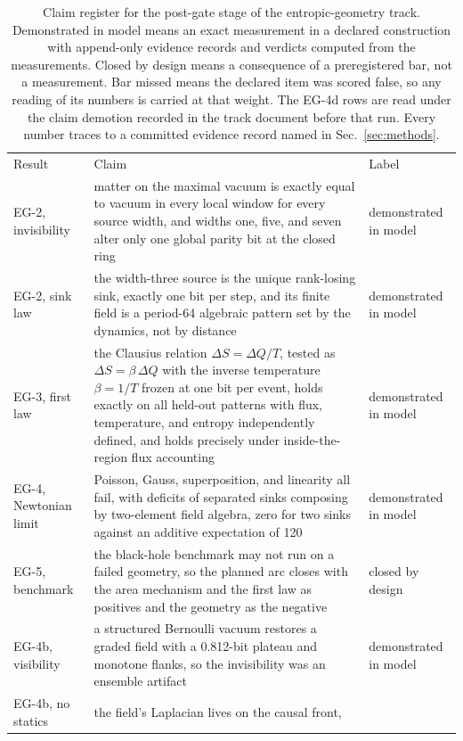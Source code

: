 \documentclass[aps,pre,reprint,nofootinbib]{revtex4-2}
\begin{document}
\begin{table}[t]
\caption{Claim register for the post-gate stage of the
entropic-geometry track.  Demonstrated in model means an exact
measurement in a declared construction with append-only evidence
records and verdicts computed from the measurements.  Closed by
design means a consequence of a preregistered bar, not a measurement.
Bar missed means the declared item was scored false, so any reading
of its numbers is carried at that weight.
The EG-4d rows are read under the claim demotion recorded in the
track document before that run.  Every number traces to a committed
evidence record named in Sec.~\ref{sec:methods}.}
\label{tab:claims}
\begin{ruledtabular}
\begin{tabular}{L{4.6cm} L{9.2cm} l}
Result & Claim & Label \\
\colrule
EG-2, invisibility & matter on the maximal vacuum is exactly equal to
vacuum in every local window for every source width, and widths one,
five, and seven alter only one global parity bit at the closed ring &
demonstrated in model \\
EG-2, sink law & the width-three source is the unique rank-losing
sink, exactly one bit per step, and its finite field is a period-64
algebraic pattern set by the dynamics, not by distance &
demonstrated in model \\
EG-3, first law & the Clausius relation $\Delta S = \Delta Q / T$,
tested as $\Delta S = \beta\,\Delta Q$ with the inverse temperature
$\beta = 1/T$ frozen at one bit per event, holds exactly on all
held-out patterns with flux, temperature, and entropy independently
defined, and holds precisely under inside-the-region flux accounting
& demonstrated in model \\
EG-4, Newtonian limit & Poisson, Gauss, superposition, and linearity
all fail, with deficits of separated sinks composing by two-element
field algebra, zero for two sinks against an additive expectation of
120 & demonstrated in model \\
EG-5, benchmark & the black-hole benchmark may not run on a failed
geometry, so the planned arc closes with the area mechanism and the
first law as positives and the geometry as the negative & closed by
design \\
EG-4b, visibility & a structured Bernoulli vacuum restores a graded
field with a 0.812-bit plateau and monotone flanks, so the
invisibility was an ensemble artifact & demonstrated in model \\
EG-4b, no statics & the field's Laplacian lives on the causal front,

\end{tabular}
\end{ruledtabular}
\end{table}
\end{document}
